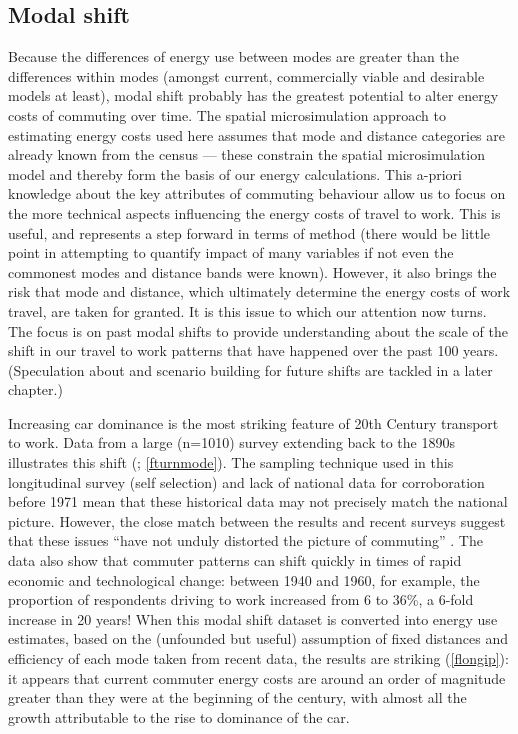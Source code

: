 \subsection{Modal shift}
Because the differences of energy use between modes are greater than the
differences within modes (amongst current, commercially viable and desirable
models at least),
modal shift probably has the greatest potential to alter energy costs of commuting
over time. The spatial microsimulation approach to estimating energy costs used
here assumes that mode and distance categories are already known from the
census --- these constrain the spatial microsimulation model and thereby form
the basis of our energy calculations. This a-priori knowledge about the key attributes
of commuting behaviour allow us to focus on the more technical aspects influencing
the energy costs of travel to work. This is useful, and represents a step forward
in terms of method (there would be little point in attempting to quantify
impact of many variables if not even the commonest modes and distance bands
were known). However, it also brings the risk that mode and distance, which ultimately
determine the energy costs of work travel, are taken for granted.
It is this issue to which our attention now turns. The focus is on past modal
shifts  to provide understanding about the scale of the
shift in our travel to work patterns that have happened over the past 100 years.
(Speculation about and scenario building for future shifts are tackled
in a later chapter.)

Increasing car dominance is the most striking feature of 20th Century transport
to work. Data from a large (n=1010) survey extending back to the 1890s
illustrates this shift (\citealp{Turnbull2000}; \cref{fturnmode}).
The sampling technique used in
this longitudinal survey (self selection) and lack of national data for
corroboration before 1971 mean that these historical data may not precisely
match the national picture. However, the close match between the results and
recent surveys suggest that these issues ``have not unduly distorted the picture
of commuting'' \citep[p.~13]{Turnbull2000}⁠.  The data also show that commuter patterns can
shift quickly in times of rapid economic and technological change: between 1940
and 1960, for example, the proportion of respondents  driving to work increased
from 6 to 36\%, a 6-fold increase in 20 years! When this modal shift dataset is
converted into energy use estimates, based on the (unfounded but useful)
assumption of fixed distances and efficiency of each mode taken from recent
data, the results are striking (\cref{flongip}): it appears that current
commuter energy costs are around an order of magnitude greater than they were
at the beginning of the century, with almost all the growth attributable to
the rise to dominance of the car.

